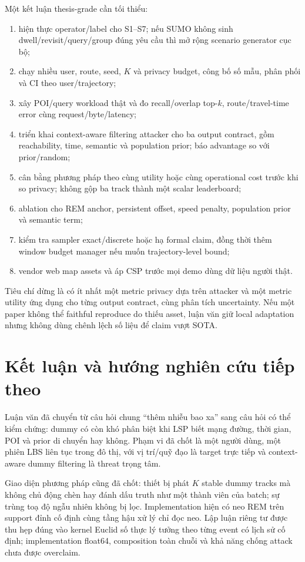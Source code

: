 \documentclass[12pt,a4paper,oneside]{report}
\begin{document}
Một kết luận thesis-grade cần tối thiểu:

\begin{enumerate}
  \item hiện thực operator/label cho S1--S7; nếu SUMO không sinh dwell/revisit/query/group đúng yêu cầu thì mở rộng scenario generator cục bộ;
  \item chạy nhiều user, route, seed, $K$ và privacy budget, công bố số mẫu, phân phối và CI theo user/trajectory;
  \item xây POI/query workload thật và đo recall/overlap top-$k$, route/travel-time error cùng request/byte/latency;
  \item triển khai context-aware filtering attacker cho ba output contract, gồm reachability, time, semantic và population prior; báo advantage so với prior/random;
  \item cân bằng phương pháp theo cùng utility hoặc cùng operational cost trước khi so privacy; không gộp ba track thành một scalar leaderboard;
  \item ablation cho REM anchor, persistent offset, speed penalty, population prior và semantic term;
  \item kiểm tra sampler exact/discrete hoặc hạ formal claim, đồng thời thêm window budget manager nếu muốn trajectory-level bound;
  \item vendor web map assets và áp CSP trước mọi demo dùng dữ liệu người thật.
\end{enumerate}

Tiêu chí dừng là có ít nhất một metric privacy dựa trên attacker và một metric utility ứng dụng cho từng output contract, cùng phân tích uncertainty. Nếu một paper không thể faithful reproduce do thiếu asset, luận văn giữ local adaptation nhưng không dùng chênh lệch số liệu để claim vượt SOTA.

\chapter{Kết luận và hướng nghiên cứu tiếp theo}

Luận văn đã chuyển từ câu hỏi chung ``thêm nhiễu bao xa'' sang câu hỏi có thể kiểm chứng: dummy có còn khó phân biệt khi LSP biết mạng đường, thời gian, POI và prior di chuyển hay không. Phạm vi đã chốt là một người dùng, một phiên LBS liên tục trong đô thị, với vị trí/quỹ đạo là target trực tiếp và context-aware dummy filtering là threat trọng tâm.

Giao diện phương pháp cũng đã chốt: thiết bị phát $K$ stable dummy tracks mà không chủ động chèn hay đánh dấu truth như một thành viên của batch; sự trùng toạ độ ngẫu nhiên không bị lọc. Implementation hiện có neo REM trên support đỉnh cố định cùng tầng hậu xử lý chỉ đọc neo. Lập luận riêng tư được thu hẹp đúng vào kernel Euclid số thực lý tưởng theo từng event có lịch sử cố định; implementation float64, composition toàn chuỗi và khả năng chống attack chưa được overclaim.
\end{document}
